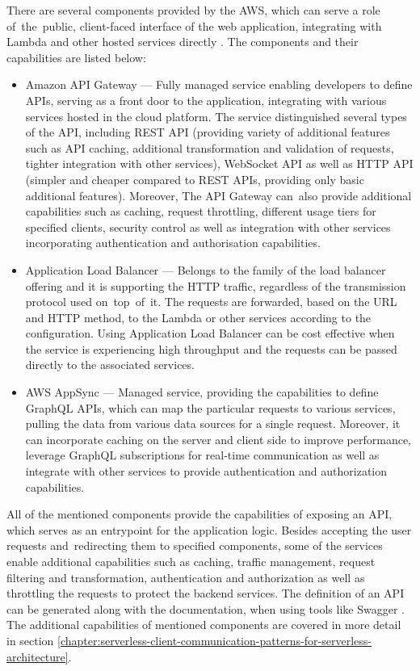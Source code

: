 There are several components provided by the AWS, which can serve a role of~the~public, client-faced interface of the web application, integrating with Lambda and other hosted services directly \cite{AWSReinventBuildingMicroservicesWithAWSLambda}. The components and their capabilities are listed below:

\begin{itemize}
   \item Amazon API Gateway ---
   Fully managed service enabling developers to define APIs, serving as a front door to the application, integrating with various services hosted in the cloud platform.
   The service distinguished several types of the API, including REST API (providing variety of additional features such as API caching, additional transformation and validation of requests, tighter integration with other services), WebSocket API as well as HTTP API (simpler and cheaper compared to REST APIs, providing only basic additional features).
   Moreover, The API Gateway can~also provide additional capabilities such as caching, request throttling, different usage tiers for specified clients, security control as well as integration with other services incorporating authentication and authorisation capabilities.
   \item Application Load Balancer ---
   Belongs to the family of the load balancer offering and it is supporting the HTTP traffic, regardless of the transmission protocol used on~top~of~it.
   The requests are forwarded, based on the URL and HTTP method, to the Lambda or other services according to the configuration.
   Using Application Load Balancer can be cost effective when the service is experiencing high throughput and the requests can be passed directly to the associated services.
   \item AWS AppSync ---
   Managed service, providing the capabilities to define GraphQL APIs, which can map the particular requests to various services, pulling the data from various data sources for a single request.
   Moreover, it can incorporate caching on the server and client side to improve performance, leverage GraphQL subscriptions for real-time communication as well as integrate with other services to provide authentication and authorization capabilities.
\end{itemize}

All of the mentioned components provide the capabilities of exposing an API, which serves as an entrypoint for the application logic.
Besides accepting the user requests and~redirecting them to specified components, some of the services enable additional capabilities such as caching, traffic management, request filtering and transformation, authentication and authorization as well as throttling the requests to protect the backend services.
The definition of an API can be generated along with the documentation, when using tools like Swagger \cite{ImplementingMicroservicesOnAWS}.
The additional capabilities of mentioned components are covered in more detail in section \ref{chapter:serverless-client-communication-patterns-for-serverless-architecture}.

